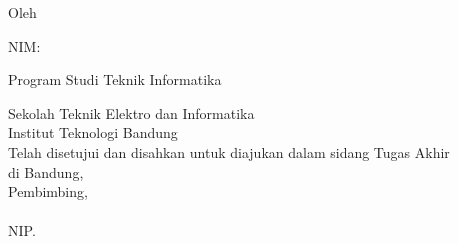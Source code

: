 \clearpage
\pagestyle{empty}

\begin{center}
\smallskip

    \Large \bfseries
    \judul
    \vfill

    \Large \context
    \vfill

    \large Oleh

    \Large \penulis

    \Large NIM: \nimpenulis

    \Large Program Studi Teknik Informatika

    \normalsize\normalfont
    Sekolah Teknik Elektro dan Informatika \\
    Institut Teknologi Bandung \\

    \vfill
    Telah disetujui dan disahkan untuk diajukan dalam sidang Tugas Akhir \\
    di Bandung, \tanggal\ \bulan\ \tahun
    \\[24pt]
    Pembimbing,
    \\[60pt]
    \underline{\pembimbing}\\
    NIP. \nippembimbing\\

\end{center}
\clearpage
